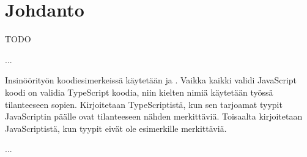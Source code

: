 
\chapter{Johdanto}

TODO

...

Insinöörityön koodiesimerkeissä käytetään  ja . Vaikka kaikki validi JavaScript koodi on validia TypeScript koodia, niin kielten nimiä käytetään työssä tilanteeseen sopien. Kirjoitetaan TypeScriptistä, kun sen tarjoamat tyypit JavaScriptin päälle ovat tilanteeseen nähden merkittäviä. Toisaalta kirjoitetaan JavaScriptistä, kun tyypit eivät ole esimerkille merkittäviä.

...